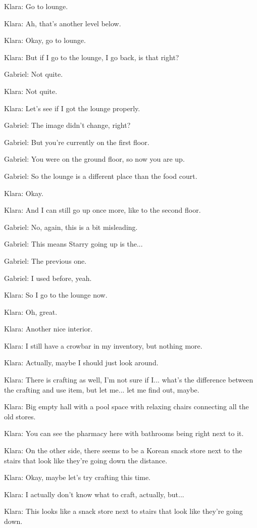 Klara: Go to lounge.

Klara: Ah, that's another level below.

Klara: Okay, go to lounge.

Klara: But if I go to the lounge, I go back, is that right?

Gabriel: Not quite.

Klara: Not quite.

Klara: Let's see if I got the lounge properly.

Gabriel: The image didn't change, right?

Gabriel: But you're currently on the first floor.

Gabriel: You were on the ground floor, so now you are up.

Gabriel: So the lounge is a different place than the food court.

Klara: Okay.

Klara: And I can still go up once more, like to the second floor.

Gabriel: No, again, this is a bit misleading.

Gabriel: This means Starry going up is the...

Gabriel: The previous one.

Gabriel: I used before, yeah.

Klara: So I go to the lounge now.

Klara: Oh, great.

Klara: Another nice interior.

Klara: I still have a crowbar in my inventory, but nothing more.

Klara: Actually, maybe I should just look around.

Klara: There is crafting as well, I'm not sure if I... what's the difference between the crafting and use item, but let me... let me find out, maybe.

Klara: Big empty hall with a pool space with relaxing chairs connecting all the old stores.

Klara: You can see the pharmacy here with bathrooms being right next to it.

Klara: On the other side, there seems to be a Korean snack store next to the stairs that look like they're going down the distance.

Klara: Okay, maybe let's try crafting this time.

Klara: I actually don't know what to craft, actually, but...

Klara: This looks like a snack store next to stairs that look like they're going down.

